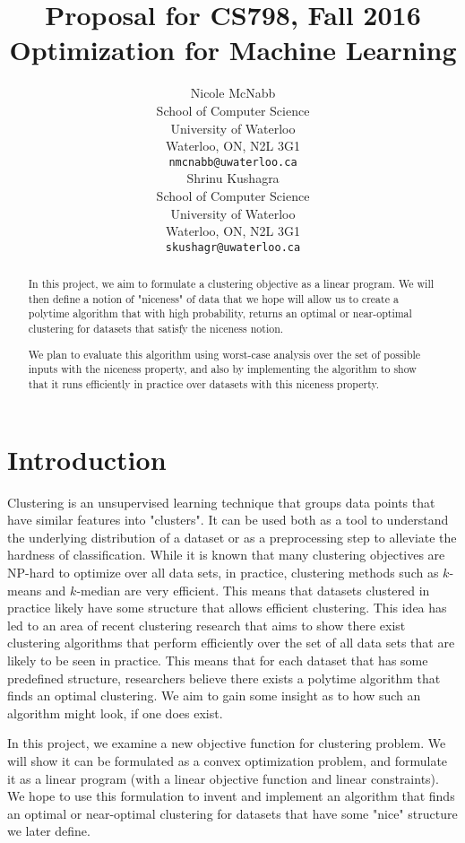 \documentclass{article}
\title{Proposal for CS798, Fall 2016\\ \large Optimization for Machine Learning}
\author{
	Nicole McNabb \\
	School of Computer Science\\
	University of Waterloo\\
	Waterloo, ON, N2L 3G1 \\
	\texttt{nmcnabb@uwaterloo.ca} \\
	\And
	Shrinu Kushagra\\
	School of Computer Science\\
	University of Waterloo\\
	Waterloo, ON, N2L 3G1 \\
	\texttt{skushagr@uwaterloo.ca} \\	
}
\begin{document}
\maketitle

\begin{abstract} 
In this project, we aim to formulate a clustering objective as a linear program. We will then define a notion of "niceness" of data that we hope will allow us to create a polytime algorithm that with high probability, returns an optimal or near-optimal clustering for datasets that satisfy the niceness notion.

We plan to evaluate this algorithm using worst-case analysis over the set of possible inputs with the niceness property, and also by implementing the algorithm to show that it runs efficiently in practice over datasets with this niceness property.
\end{abstract} 

\section{Introduction}
Clustering is an unsupervised learning technique that groups data points that have similar features into "clusters". It can be used both as a tool to understand the underlying distribution of a dataset or as a preprocessing step to alleviate the hardness of classification. While it is known that many clustering objectives are NP-hard to optimize over all data sets, in practice, clustering methods such as $k$-means and $k$-median are very efficient. This means that datasets clustered in practice likely have some structure that allows efficient clustering. This idea has led to an area of recent clustering research that aims to show there exist clustering algorithms that perform efficiently over the set of all data sets that are likely to be seen in practice. This means that for each dataset that has some predefined structure, researchers believe there exists a polytime algorithm that finds an optimal clustering. We aim to gain some insight as to how such an algorithm might look, if one does exist.

In this project, we examine a new objective function for clustering problem. We will show it can be formulated as a convex optimization problem, and formulate it as a linear program (with a linear objective function and linear constraints). We hope to use this formulation to invent and implement an algorithm that finds an optimal or near-optimal clustering for datasets that have some "nice" structure we later define.
\end{document}
